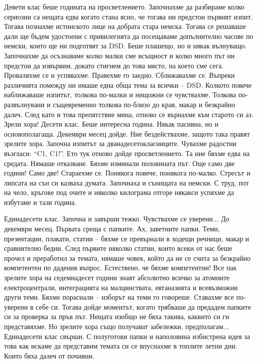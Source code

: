 \begin{multicols}{3}
Девети клас беше годината на просветлението. Започнахме да разбираме колко 
сериозни са нещата едва когато стана ясно, че 
тогава ни предстои първият изпит. Тогава познахме истинското лице на добрата 
стара немска. Тогава се решаваше дали ще бъдем удостоени с привилегията да 
посещаваме допълнително часове по немски, които ще ни подготвят за DSD. Беше 
плашещо, но и някак вълнуващо. 
Започнахме да осъзнаваме колко малки сме всъщност и колко много път ни предстои 
да извървим, докато стигнем до това място, на което сме сега. Проваляхме се и 
успявахме. Правехме го заедно. Сближавахме се.  Въпреки различията помежду ни 
имаше една обща тема за всички – DSD. 
Колкото повече наближаваше изпитът, толкова по-малки и нищожни се чувствахме. 
Толкова по-развълнувани и същевременно толкова по-близо до края, макар и 
безкрайно далеч. След като и това препятствие мина, отново се върнахме към 
старото си аз. Зрели хора!
Десети клас. Беше интересна година. Някак пасивна, но и основополагаща. Декември 
месец дойде. Ние бездействахме, защото така правят зрелите хора. Започна изпитът 
за дванадесетокласниците. Чувахме радостни възгласи: “C1, C1!”. Ето тук отново 
дойде просветлението. Та ние бяхме едва на средата. Нямаше отказване. Бяхме 
изминали половината път. Още само две години! Само две! 
Стараехме се. Понякога повече, понякога по-малко. Стресът и липсата на сън си 
казваха думата. Започнаха и сънищата на немски.  С труд, пот на чело, кръгове 
под очите и няколко килограма отгоре някакси 
успяхме да избутаме и тази година.

Единадесети клас. Започна и завърши тежко. Чувствахме се уверени... До декември 
месец. Първата среща с папките. Ах, заветните папки. Теми, презентации, плакати, 
статии – бяхме се превърнали в ходещи речници, макар и сравнително бедни. След 
първите няколко статии, които всеки от нас беше прочел и преработил за темата, 
нямаше човек, който да не се счита за безкрайно компетентен по дадения въпрос. 
Естествено, че бяхме компетентни! Все пак зрелите хора на седемнадесет години 
знаят абсолютно всичко за атомните електроцентрали, интеграцията на 
малцинствата, евтаназията и всевъзможни други теми. Бяхме пораснали – изборът 
на 
теми го говореше. Ставахме все по-уверени в себе си. Тогава дойде моментът, 
когато трябваше да предадем папките си за проверка за пръв път. Нещата изобщо не 
бяха такива, каквито си ги представяхме. Но зрелите хора също получават 
забележки, предполагам... Единадесети клас свърши. С полуготови папки и 
наполовина избистрена идея за това как искаме да представим темата си се 
впуснахме в топлите летни дни. Които бяха далеч от почивни.


\end{multicols}
